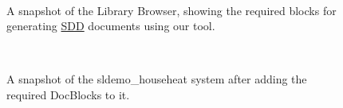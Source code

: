 \documentclass{mcscert}
\begin{document}
\begin{figure}
	\caption{A snapshot of the Library Browser, showing the required blocks	for generating \hyperref[acr:sdd]{SDD} documents using our tool.}
	\centering
	\label{fig:lib-browser}
	\\
\end{figure}
\begin{figure}
	\caption{A snapshot of the sldemo\_househeat system after adding the required	\textsf{DocBlocks} to it.}
	\centering
	\label{fig:ex-topsys-2}
	\\
\end{figure}
\end{document}
